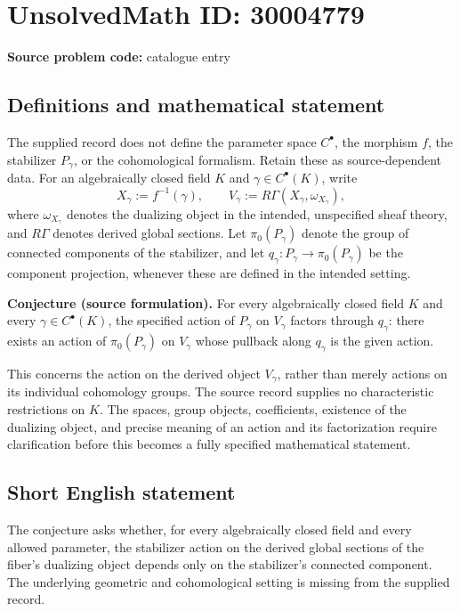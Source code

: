 \documentclass[11pt]{article}
\begin{document}
\section*{UnsolvedMath ID: 30004779}
\textbf{Source problem code:} catalogue entry
\subsection{Definitions and mathematical statement}
The supplied record does not define the parameter space \(C^{\bullet}\), the morphism \(f\), the stabilizer \(P_\gamma\), or the cohomological formalism. Retain these as source-dependent data. For an algebraically closed field \(K\) and \(\gamma\in C^{\bullet}(K)\), write
\[
X_\gamma:=f^{-1}(\gamma),\qquad V_\gamma:=R\Gamma(X_\gamma,\omega_{X_\gamma}),
\]
where \(\omega_{X_\gamma}\) denotes the dualizing object in the intended, unspecified sheaf theory, and \(R\Gamma\) denotes derived global sections. Let \(\pi_0(P_\gamma)\) denote the group of connected components of the stabilizer, and let \(q_\gamma:P_\gamma\to\pi_0(P_\gamma)\) be the component projection, whenever these are defined in the intended setting.

\textbf{Conjecture (source formulation).} For every algebraically closed field \(K\) and every \(\gamma\in C^{\bullet}(K)\), the specified action of \(P_\gamma\) on \(V_\gamma\) factors through \(q_\gamma\): there exists an action of \(\pi_0(P_\gamma)\) on \(V_\gamma\) whose pullback along \(q_\gamma\) is the given action.

This concerns the action on the derived object \(V_\gamma\), rather than merely actions on its individual cohomology groups. The source record supplies no characteristic restrictions on \(K\). The spaces, group objects, coefficients, existence of the dualizing object, and precise meaning of an action and its factorization require clarification before this becomes a fully specified mathematical statement.
\subsection{Short English statement}
The conjecture asks whether, for every algebraically closed field and every allowed parameter, the stabilizer action on the derived global sections of the fiber's dualizing object depends only on the stabilizer's connected component. The underlying geometric and cohomological setting is missing from the supplied record.
\end{document}
